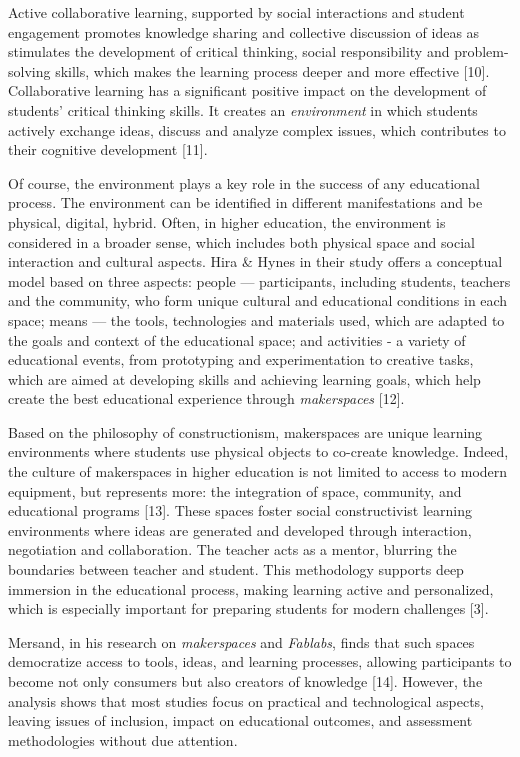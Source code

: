 Active collaborative learning, supported by social interactions and
student engagement promotes knowledge sharing and collective discussion
of ideas as stimulates the development of critical thinking, social
responsibility and problem-solving skills, which makes the learning
process deeper and more effective {[}10{]}. Collaborative learning has a
significant positive impact on the development of
students'{} critical thinking skills. It creates an
\emph{environment} in which students actively exchange ideas, discuss
and analyze complex issues, which contributes to their cognitive
development {[}11{]}.

Of course, the environment plays a key role in the success of any
educational process. The environment can be identified in different
manifestations and be physical, digital, hybrid. Often, in higher
education, the environment is considered in a broader sense, which
includes both physical space and social interaction and cultural
aspects. Hira \& Hynes in their study offers a conceptual model based on
three aspects: people --- participants, including students, teachers and
the community, who form unique cultural and educational conditions in
each space; means --- the tools, technologies and materials used, which
are adapted to the goals and context of the educational space; and
activities - a variety of educational events, from prototyping and
experimentation to creative tasks, which are aimed at developing skills
and achieving learning goals, which help create the best educational
experience through \emph{makerspaces} {[}12{]}.

Based on the philosophy of constructionism, makerspaces are unique
learning environments where students use physical objects to co-create
knowledge. Indeed, the culture of makerspaces in higher education is not
limited to access to modern equipment, but represents more: the
integration of space, community, and educational programs {[}13{]}.
These spaces foster social constructivist learning environments where
ideas are generated and developed through interaction, negotiation and
collaboration. The teacher acts as a mentor, blurring the boundaries
between teacher and student. This methodology supports deep immersion in
the educational process, making learning active and personalized, which
is especially important for preparing students for modern challenges
{[}3{]}.\hspace{0pt}

Mersand, in his research on \emph{makerspaces} and \emph{Fablabs}, finds
that such spaces democratize access to tools, ideas, and learning
processes, allowing participants to become not only consumers but also
creators of knowledge {[}14{]}. However, the analysis shows that most
studies focus on practical and technological aspects, leaving issues of
inclusion, impact on educational outcomes, and assessment methodologies
without due attention.


